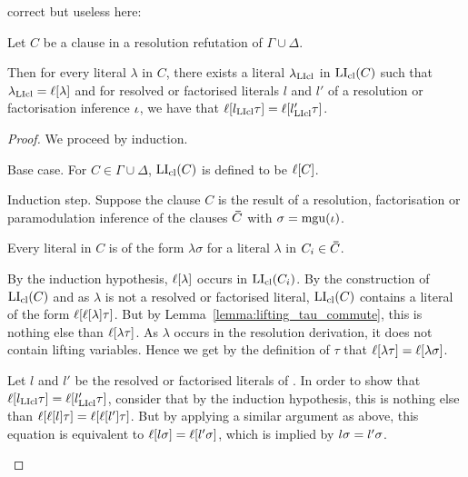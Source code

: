 \documentclass[,%
	draft=false,%
	numbers=noendperiod
	11pt,
	a4paper,
	oneside,%
	openany,
]{memoir}
\begin{document}
{correct but useless here:

	\tiny 

\begin{lemma}
	\label{lemma:li_vs_clause_plus_literals_equal}
	Let $C$ be a clause in a resolution refutation of $\Gamma\cup\Delta$.

	Then for every literal $\lambda$ in $C$, there exists a literal $\lambda_{\operatorname{LIcl}}$ in\nolinebreak{} $\operatorname{LI}_{\operatorname{cl}}(C)$ such that $\lambda_{\operatorname{LIcl}} = \ell[\lambda]$ and for resolved or factorised literals $l$ and $l'$ of a resolution or factorisation inference $\iota$, we have that $\ell[l_{\operatorname{LIcl}}\tau] = \ell[l'_{\operatorname{LIcl}}\tau]$.
\end{lemma}
\begin{proof}
	We proceed by induction.
	\begin{description}
		\item{} Base case.
			For $C\in\Gamma\cup\Delta$, $\operatorname{LI}_{\operatorname{cl}}(C)$ is defined to be $\ell[C]$.

		\item{} Induction step.
			Suppose the clause $C$ is the result of a resolution, factorisation or paramodulation inference \inference{} of the clauses $\bm\bar C$ with $\sigma = \operatorname{mgu}(\iota)$.


			Every literal in $C$ is of the form $\lambda\sigma$ for a literal $\lambda$ in $C_i\in\bm\bar C$.

			By the induction hypothesis, $\ell[\lambda]$ occurs in $\operatorname{LI}_{\operatorname{cl}}(C_i)$.
			By the construction of $\operatorname{LI}_{\operatorname{cl}}(C)$ and as $\lambda$ is not a resolved or factorised literal, $\operatorname{LI}_{\operatorname{cl}}(C)$ contains a literal of the form $\ell[\ell[\lambda]\tau]$.
			But by Lemma~\ref{lemma:lifting_tau_commute}, this is nothing else than $\ell[\lambda\tau]$.
			As $\lambda$ occurs in the resolution derivation, it does not contain lifting variables.
			Hence we get by the definition of $\tau$ that $\ell[\lambda\tau] = \ell[\lambda\sigma]$.

			Let $l$ and $l'$ be the resolved or factorised literals of \inference.
			In order to show that $\ell[l_{\operatorname{LIcl}}\tau] = \ell[l'_{\operatorname{LIcl}}\tau]$,
			consider that by the induction hypothesis, this is nothing else than
			$\ell[\ell[l]\tau] = \ell[\ell[l']\tau]$.
			But by applying a similar argument as above, this equation is equivalent to
			$\ell[l\sigma] = \ell[l'\sigma]$, which is implied by $l\sigma =\nolinebreak l'\sigma$.
			\qedhere


\end{description}
\end{proof}}
\end{document}
